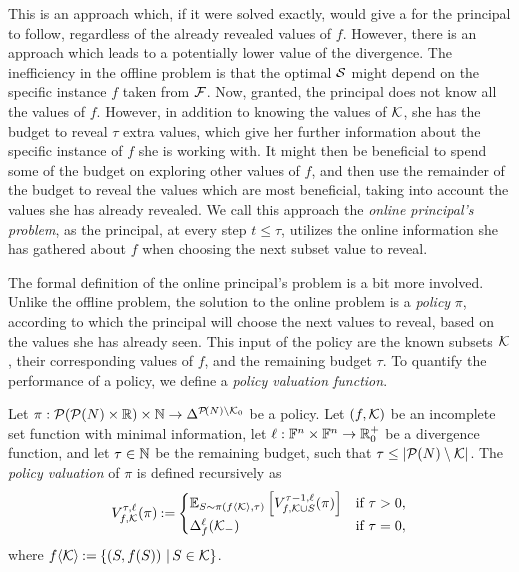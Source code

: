 This is an approach which, if it were solved exactly, would give a  for the principal to follow, regardless of the already revealed values of $ f $.
However, there is an approach which leads to a potentially lower value of the divergence.
The inefficiency in the offline problem is that the optimal $ \mathcal{S} $ might depend on the specific instance $ f $ taken from $ \mathcal{F} $.
Now, granted, the principal does not know all the values of $ f $.
However, in addition to knowing the values of $ \mathcal{K} $, she has the budget to reveal $ \tau $ extra values, which give her further information about the specific instance of $ f $ she is working with.
It might then be beneficial to spend some of the budget on exploring other values of $ f $,
and then use the remainder of the budget to reveal the values which are most beneficial, taking into account the values she has already revealed.
We call this approach the \emph{online principal's problem}, as the principal, at every step $ t \leq \tau $, utilizes the online information she has gathered about $ f $ when choosing the next subset value to reveal.

The formal definition of the online principal's problem is a bit more involved.
Unlike the offline problem, the solution to the online problem is a \emph{policy} $ \pi $, according to which the principal will choose the next values to reveal, based on the values she has already seen.
This input of the policy are the known subsets $ \mathcal{K} $, their corresponding values of $ f $, and the remaining budget $ \tau $.
To quantify the performance of a policy, we define a \emph{policy valuation function}.

\begin{defi}\label{def:online-pv}
  Let $ \pi: \mathcal{P}\!\left(\mathcal{P}\!\left(N\right) \times \mathbb{R}\right) \times \mathbb{N} \to \Delta^{\mathcal{P}\!\left(N\right) \setminus \mathcal{K}_0} $ be a policy.
  Let $ \left( f, \mathcal{K} \right) $ be an incomplete set function with minimal information, let $ \ell: \mathbb{F}^n \times \mathbb{F}^n \to \mathbb{R}^+_0 $ be a divergence function,
  and let $ \tau \in \mathbb{N} $ be the remaining budget, such that $ \tau \leq \left\lvert \mathcal{P}\!\left(N\right) \setminus \mathcal{K} \right\rvert $.
  The \emph{policy valuation} of $ \pi $ is defined recursively as \[
    V^{\tau,\ell}_{f,\mathcal{K}}\!\left(\pi\right) \mathbin{:=} \begin{cases}
      \operatorname*{\mathbb{E}}_{S \sim \pi(f\left< \mathcal{K} \right>, \tau)} \left[ V^{\tau - 1,\ell}_{f,\mathcal{K} \cup S}\!\left(\pi\right) \right] & \text{if } \tau > 0, \\
      \Delta_{f}^{\ell}\!\left(\mathcal{K}_-\right) & \text{if } \tau = 0,
    \end{cases}
  \]
  where $ f \!\left< \mathcal{K} \right> \mathbin{:=} \left\{ \left( S, f\!\left(S\right) \right) \,|\, S \in \mathcal{K} \right\} $.
\end{defi}


